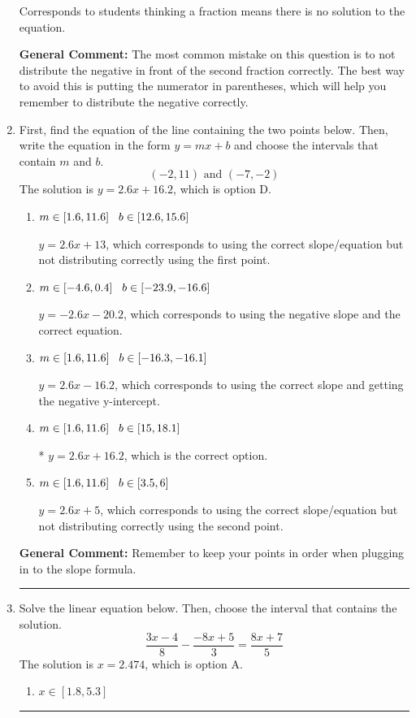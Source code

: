 \documentclass{extbook}[14pt]
\newcommand{\litem}[1]{\item #1

\rule{\textwidth}{0.4pt}}
\begin{document}
\begin{enumerate}
{\begin{enumerate}[label=\Alph*.]
Corresponds to students thinking a fraction means there is no solution to the equation.
\end{enumerate}

\textbf{General Comment:} The most common mistake on this question is to not distribute the negative in front of the second fraction correctly. The best way to avoid this is putting the numerator in parentheses, which will help you remember to distribute the negative correctly.
}
\litem{
First, find the equation of the line containing the two points below. Then, write the equation in the form $ y=mx+b $ and choose the intervals that contain $m$ and $b$.
\[ (-2, 11) \text{ and } (-7, -2) \]The solution is \( y = 2.6x + 16.2 \), which is option D.\begin{enumerate}[label=\Alph*.]
\item \( m \in [1.6, 11.6] \hspace*{3mm} b \in [12.6, 15.6] \)

 $y = 2.6x + 13$, which corresponds to using the correct slope/equation but not distributing correctly using the first point.
\item \( m \in [-4.6, 0.4] \hspace*{3mm} b \in [-23.9, -16.6] \)

 $y = -2.6x -20.2$, which corresponds to using the negative slope and the correct equation.
\item \( m \in [1.6, 11.6] \hspace*{3mm} b \in [-16.3, -16.1] \)

 $y = 2.6x -16.2$, which corresponds to using the correct slope and getting the negative y-intercept.
\item \( m \in [1.6, 11.6] \hspace*{3mm} b \in [15, 18.1] \)

* $y = 2.6x + 16.2$, which is the correct option.
\item \( m \in [1.6, 11.6] \hspace*{3mm} b \in [3.5, 6] \)

 $y = 2.6x + 5$, which corresponds to using the correct slope/equation but not distributing correctly using the second point.
\end{enumerate}

\textbf{General Comment:} Remember to keep your points in order when plugging in to the slope formula.
}
\litem{
Solve the linear equation below. Then, choose the interval that contains the solution.
\[ \frac{3x -4}{8} - \frac{-8x + 5}{3} = \frac{8x + 7}{5} \]The solution is \( x = 2.474 \), which is option A.\begin{enumerate}[label=\Alph*.]
\item \( x \in [1.8, 5.3] \)


\end{enumerate}}
\end{enumerate}
\end{document}
